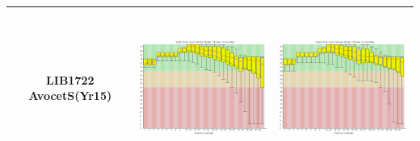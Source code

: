 \begin{center}
\begin{tabular}{ccc}
\begin{sideways}LIB1722 AvocetS(Yr15)\end{sideways} & \includegraphics[height=5cm]{Appendices/images/Sample_LIB1722_base_quality_R1.png} & \includegraphics[height=5cm]{Appendices/images/Sample_LIB1722_base_quality_R2.png} \\   

\bottomrule
\end{tabular}
\end{center}

